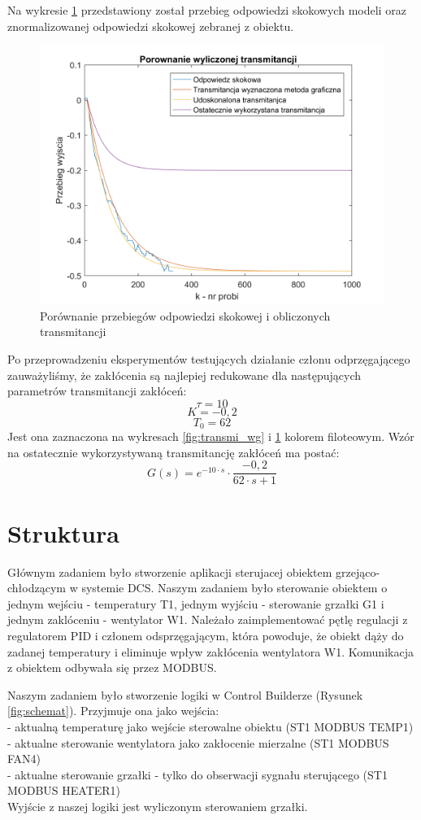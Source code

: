 \documentclass[12pt, a4paper]{article}
\begin{document}
Na wykresie \ref{fig:transmi_wdlep} przedstawiony został przebieg odpowiedzi skokowych modeli oraz znormalizowanej odpowiedzi skokowej zebranej z obiektu.
\begin{figure}[H]
	\centering
	\includegraphics[width=0.9\linewidth]{transmi_wdlep}
	\caption  {Porównanie przebiegów odpowiedzi skokowej i obliczonych transmitancji}
	\label{fig:transmi_wdlep}
\end{figure}
Po przeprowadzeniu eksperymentów testujących działanie członu odprzęgającego zauważyliśmy, że zakłócenia są najlepiej redukowane dla następujących parametrów transmitancji zakłóceń:
\[\tau=10\]
\[K=-0,2\]
\[T_{0}=62\]
Jest ona zaznaczona na wykresach \ref{fig:transmi_wg} i \ref{fig:transmi_wdlep} kolorem filoteowym.
Wzór na ostatecznie wykorzystywaną transmitancję zakłóceń ma postać:
\[G(s)=e^{-10 \cdot s} \cdot \frac{-0,2}{62 \cdot s +1}\]


\section{Struktura}
Głównym zadaniem było stworzenie aplikacji sterujacej obiektem grzejąco-chłodzącym w systemie DCS. Naszym zadaniem było sterowanie obiektem o jednym wejściu - temperatury T1, jednym wyjściu - sterowanie grzałki G1 i jednym zaklóceniu - wentylator W1. Należało zaimplementować pętlę regulacji z regulatorem PID i członem odsprzęgającym, która powoduje, że obiekt dąży do zadanej temperatury i eliminuje wpływ zakłócenia wentylatora W1. Komunikacja z obiektem odbywała się przez MODBUS. 

Naszym zadaniem było stworzenie logiki w Control Builderze (Rysunek \ref{fig:schemat}). Przyjmuje ona jako wejścia:\\
- aktualną temperaturę jako wejście sterowalne obiektu (ST1 MODBUS TEMP1)\\
- aktualne sterowanie wentylatora jako zakłocenie mierzalne (ST1 MODBUS FAN4)\\
- aktualne sterowanie grzałki - tylko do obserwacji sygnału sterującego (ST1 MODBUS HEATER1)\\
Wyjście z naszej logiki jest wyliczonym sterowaniem grzałki. \\
\end{document}
